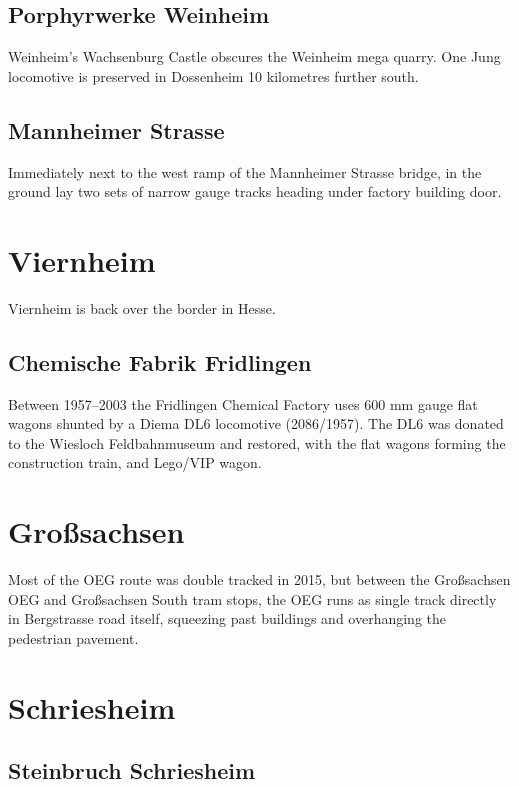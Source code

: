 \documentclass[a4paper]{report}
\begin{document}
\subsection{Porphyrwerke Weinheim}

Weinheim's Wachsenburg Castle obscures the Weinheim mega quarry.  One
Jung locomotive is preserved in Dossenheim 10 kilometres further south.

\subsection{Mannheimer Strasse}

Immediately next to the west ramp of the Mannheimer Strasse bridge, in
the ground lay two sets of narrow gauge tracks heading under
factory building door.

\section{Viernheim}

Viernheim is back over the border in Hesse.

\subsection{Chemische Fabrik Fridlingen}

Between 1957--2003 the Fridlingen Chemical Factory uses 600 mm gauge
flat wagons shunted by a Diema DL6 locomotive (2086/1957).  The DL6
was donated to the Wiesloch Feldbahnmuseum and restored, with the flat
wagons forming the construction train, and Lego/VIP wagon.

\section{Großsachsen}

Most of the OEG route was double tracked in 2015, but between the
Großsachsen OEG and Großsachsen South tram stops, the OEG runs as
single track directly in Bergstrasse road itself, squeezing past
buildings and overhanging the pedestrian pavement.

\section{Schriesheim}

\subsection{Steinbruch Schriesheim}
\end{document}

